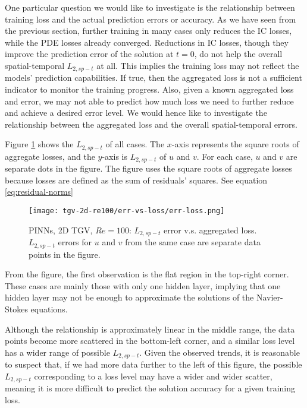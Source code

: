 One particular question we would like to investigate is the relationship between training loss and the actual prediction errors or accuracy.
As we have seen from the previous section, further training in many cases only reduces the IC losses, while the PDE losses already converged.
Reductions in IC losses, though they improve the prediction error of the solution at $t=0$, do not help the overall spatial-temporal $L_{2,sp-t}$ at all.
This implies the training loss may not reflect the models' prediction capabilities.
If true, then the aggregated loss is not a sufficient indicator to monitor the training progress.
Also, given a known aggregated loss and error, we may not able to predict how much loss we need to further reduce and achieve a desired error level.
We would hence like to investigate the relationship between the aggregated loss and the overall spatial-temporal errors.

Figure \ref{fig:tgv2d-re100-err-vs-loss} shows the $L_{2,sp-t}$ of all cases.
The $x$-axis represents the square roots of aggregate losses, and the $y$-axis is $L_{2,sp-t}$ of $u$ and $v$.
For each case, $u$ and $v$ are separate dots in the figure.
The figure uses the square roots of aggregate losses because losses are defined as the sum of residuals' squares.
See equation \eqref{eq:residual-norms}

\begin{figure}[hbt!]
    \centering%
    \texttt{[image: tgv-2d-re100/err-vs-loss/err-loss.png]}
    \caption[%
        PINNs, 2D TGV, $Re=100$: $L_{2,sp-t}$ error v.s. aggregated loss%
    ]{%
        PINNs, 2D TGV, $Re=100$: $L_{2,sp-t}$ error v.s. aggregated loss. %
        $L_{2,sp-t}$ errors for $u$ and $v$ from the same case are separate data points in the figure.
    }
    \label{fig:tgv2d-re100-err-vs-loss}
\end{figure}

From the figure, the first observation is the flat region in the top-right corner.
These cases are mainly those with only one hidden layer, implying that one hidden layer may not be enough to approximate the solutions of the Navier-Stokes equations.

Although the relationship is approximately linear in the middle range, the data points become more scattered in the bottom-left corner, and a similar loss level has a wider range of possible $L_{2,sp-t}$.
Given the observed trends, it is reasonable to suspect that, if we had more data further to the left of this figure, the possible $L_{2,sp-t}$ corresponding to a loss level may have a wider and wider scatter, meaning it is more difficult to predict the solution accuracy for a given training loss.

